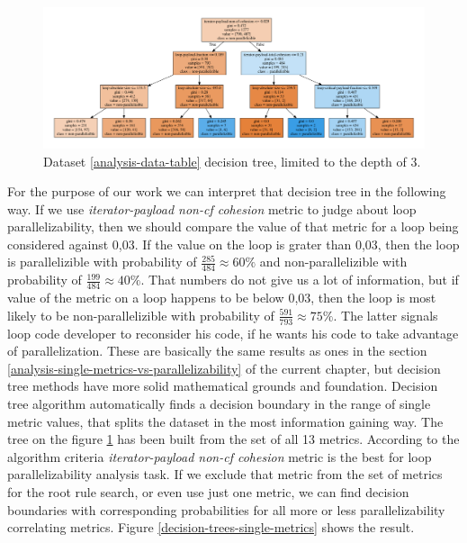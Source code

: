 \begin{figure}[htb]
\centering
\includegraphics[width=\linewidth]{figs/decision-tree-depth-3.pdf}
\caption{Dataset \ref{analysis-data-table} decision tree, limited to the depth of 3.}
\label{decision-tree-depth-3}
\end{figure}\newline
\null\qquad For the purpose of our work we can interpret that decision tree in the following way. If we use \textit{iterator-payload non-cf cohesion} metric to judge about loop parallelizability, then we should compare the value of that metric for a loop being considered against 0,03. If the value on the loop is grater than 0,03, then the loop is parallelizible with probability of $\frac{285}{484}\approx 60\%$ and non-parallelizible with probability of $\frac{199}{484}\approx 40\%$. That numbers do not give us a lot of information, but if value of the metric on a loop happens to be below 0,03, then the loop is most likely to be non-parallelizible with probability of $\frac{591}{793}\approx 75\%$. The latter signals loop code developer to reconsider his code, if he wants his code to take advantage of parallelization.\newline 
\null\qquad These are basically the same results as ones in the section \ref{analysis-single-metrics-vs-parallelizability} of the current chapter, but decision tree methods have more solid mathematical grounds and foundation. Decision tree algorithm automatically finds a decision boundary in the range of single metric values, that splits the dataset in the most information gaining way. The tree on the figure \ref{decision-tree-depth-3} has been built from the set of all 13 metrics. According to the algorithm criteria \textit{iterator-payload non-cf cohesion} metric is the best for loop parallelizability analysis task. If we exclude that metric from the set of metrics for the root rule search, or even use just one metric, we can find decision boundaries with corresponding probabilities for all more or less parallelizability correlating metrics. Figure \ref{decision-trees-single-metrics} shows the result.
